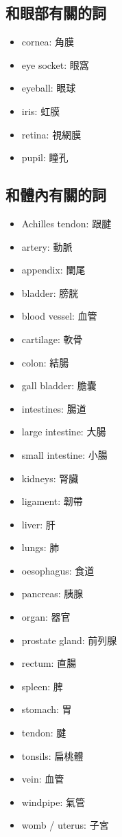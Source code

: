 \subsection{和眼部有關的詞}
\begin{multicols}{3}
\begin{itemize}
  \itemsep0em
  \item cornea: 角膜
  \item eye socket: 眼窩
  \item eyeball: 眼球
  \item iris: 虹膜
  \item retina: 視網膜
  \item pupil: 瞳孔
\end{itemize}
\end{multicols}

\subsection{和體內有關的詞}
\begin{multicols}{3}
\begin{itemize}
  \itemsep0em
  \item Achilles tendon: 跟腱
  \item artery: 動脈
  \item appendix: 闌尾
  \item bladder: 膀胱
  \item blood vessel: 血管
  \item cartilage: 軟骨
  \item colon: 結腸
  \item gall bladder: 膽囊
  \item intestines: 腸道
  \item large intestine: 大腸
  \item small intestine: 小腸
  \item kidneys: 腎臟
  \item ligament: 韌帶
  \item liver: 肝
  \item lungs: 肺
  \item oesophagus: 食道
  \item pancreas: 胰腺
  \item organ: 器官
  \item prostate gland: 前列腺
  \item rectum: 直腸
  \item spleen: 脾
  \item stomach: 胃
  \item tendon: 腱
  \item tonsils: 扁桃體
  \item vein: 血管
  \item windpipe: 氣管
  \item womb / uterus: 子宮
\end{itemize}
\end{multicols}

